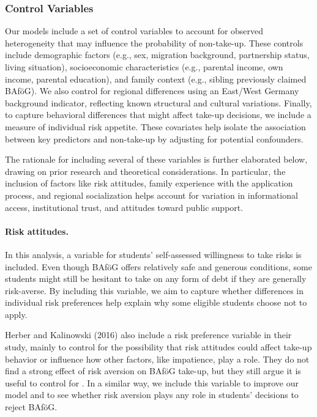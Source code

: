 \subsubsection{Control Variables}

Our models include a set of control variables to account for observed heterogeneity that may influence the probability of non-take-up. These controls include demographic factors (e.g., sex, migration background, partnership status, living situation), socioeconomic characteristics (e.g., parental income, own income, parental education), and family context (e.g., sibling previously claimed BAföG). We also control for regional differences using an East/West Germany background indicator, reflecting known structural and cultural variations. Finally, to capture behavioral differences that might affect take-up decisions, we include a measure of individual risk appetite. These covariates help isolate the association between key predictors and non-take-up by adjusting for potential confounders.

The rationale for including several of these variables is further elaborated below, drawing on prior research and theoretical considerations. In particular, the inclusion of factors like risk attitudes, family experience with the application process, and regional socialization helps account for variation in informational access, institutional trust, and attitudes toward public support.

\paragraph{Risk attitudes.} In this analysis, a variable for students' self-assessed willingness to take risks is included. Even though BAföG offers relatively safe and generous conditions, some students might still be hesitant to take on any form of debt if they are generally risk-averse. By including this variable, we aim to capture whether differences in individual risk preferences help explain why some eligible students choose not to apply.

Herber and Kalinowski (2016) also include a risk preference variable in their study, mainly to control for the possibility that risk attitudes could affect take-up behavior or influence how other factors, like impatience, play a role. They do not find a strong effect of risk aversion on BAföG take-up, but they still argue it is useful to control for \citep{herber_non-take-up_2019}. In a similar way, we include this variable to improve our model and to see whether risk aversion plays any role in students’ decisions to reject BAföG.

